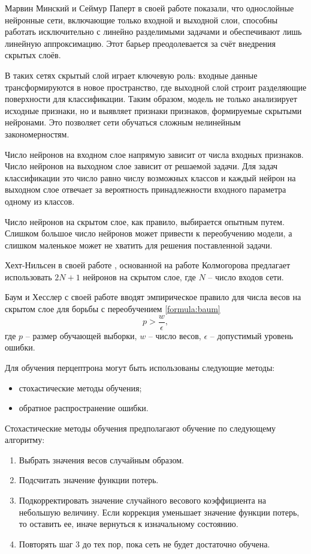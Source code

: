 Марвин Минский и Сеймур Паперт в своей работе \cite{minsky1969perceptrons} показали, что однослойные нейронные сети, включающие только входной и выходной слои, способны работать исключительно с линейно разделимыми задачами и обеспечивают лишь линейную аппроксимацию.
Этот барьер преодолевается за счёт внедрения скрытых слоёв.

В таких сетях скрытый слой играет ключевую роль: входные данные трансформируются в новое пространство, где выходной слой строит разделяющие поверхности для классификации.
Таким образом, модель не только анализирует исходные признаки, но и выявляет признаки признаков, формируемые скрытыми нейронами. 
Это позволяет сети обучаться сложным нелинейным закономерностям.

Число нейронов на входном слое напрямую зависит от числа входных признаков.
Число нейронов на выходном слое зависит от решаемой задачи.
Для задач классификации это число равно числу возможных классов и каждый нейрон на выходном слое отвечает за вероятность принадлежности входного параметра одному из классов.

Число нейронов на скрытом слое, как правило, выбирается опытным путем.
Слишком большое число нейронов может привести к переобучению модели, а слишком маленькое может не хватить для решения поставленной задачи.

Хехт-Нильсен в своей работе \cite{hecht1987}, основанной на работе Колмогорова \cite{kolmogorov1957} предлагает использовать $2N + 1$ нейронов на скрытом слое, где $N$ -- число входов сети.

Баум и Хесслер с своей работе \cite{baum1989} вводят эмпирическое правило для числа весов на скрытом слое для борьбы с переобучением \ref{formula:baum}
\begin{equation}\label{formula:baum}
	p > \frac{w}{\epsilon},
\end{equation}
где $p$ -- размер обучающей выборки, $w$ -- число весов, $\epsilon$ -- допустимый уровень ошибки.

Для обучения перцептрона могут быть использованы следующие методы:
\begin{itemize}
	\item стохастические методы обучения;
	\item обратное распространение ошибки.
\end{itemize}

Стохастические методы обучения предполагают обучение по следующему алгоритму:
\begin{enumerate}
	\item Выбрать значения весов случайным образом.
	\item Подсчитать значение функции потерь.
	\item Подкорректировать значение случайного весового коэффициента на небольшую величину. Если коррекция уменьшает значение функции потерь, то оставить ее, иначе вернуться к изначальному состоянию.
	\item Повторять шаг 3 до тех пор, пока сеть не будет достаточно обучена.
\end{enumerate}


